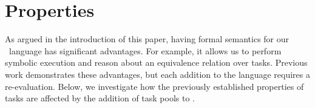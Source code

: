 \section{Properties}
\label{sec:properties}

As argued in the introduction of this paper, having formal semantics for our \TOP\ language has significant advantages.
For example, it allows us to perform symbolic execution and reason about an equivalence relation over tasks.
Previous work demonstrates these advantages, but each addition to the language requires a re-evaluation.
Below, we investigate how the previously established properties of tasks are affected by the addition of task pools to \TOPHAT.



% 
